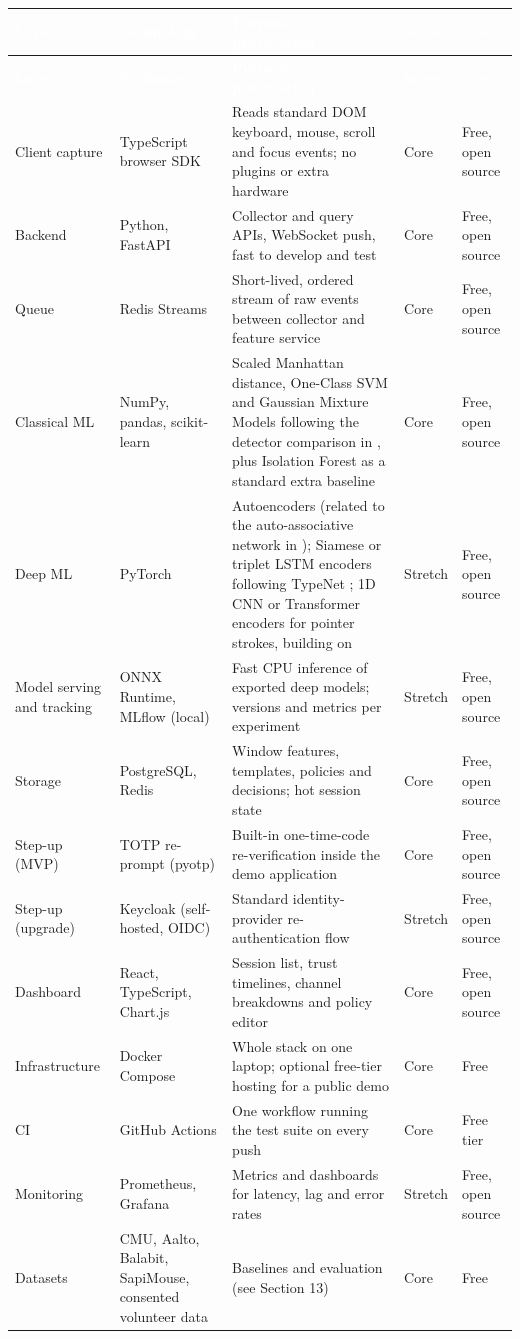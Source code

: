 \documentclass[10pt,letterpaper]{article}
\newcommand{\hd}[1]{\textcolor{white}{\bfseries #1}}
\newcommand{\headrow}{\rowcolor{navy}}
\begin{document}
\begin{xltabular}{\textwidth}{P{2.2cm} P{3.1cm} L P{1.2cm} P{1.5cm}}
\headrow \hd{Layer} & \hd{Technology} & \hd{Purpose / justification} & \hd{Scope} & \hd{Cost} \\
\endfirsthead
\headrow \hd{Layer} & \hd{Technology} & \hd{Purpose / justification} & \hd{Scope} & \hd{Cost} \\
\endhead
Client capture & TypeScript browser SDK & Reads standard DOM keyboard, mouse, scroll and focus events; no plugins or extra hardware & Core & Free, open source \\ \hline
Backend & Python, FastAPI & Collector and query APIs, WebSocket push, fast to develop and test & Core & Free, open source \\ \hline
Queue & Redis Streams & Short-lived, ordered stream of raw events between collector and feature service & Core & Free, open source \\ \hline
Classical ML & NumPy, pandas, scikit-learn & Scaled Manhattan distance, One-Class SVM and Gaussian Mixture Models following the detector comparison in \cite{killourhy2009}, plus Isolation Forest as a standard extra baseline & Core & Free, open source \\ \hline
Deep ML & PyTorch & Autoencoders (related to the auto-associative network in \cite{killourhy2009}); Siamese or triplet LSTM encoders following TypeNet \cite{acien2022}; 1D CNN or Transformer encoders for pointer strokes, building on \cite{antal2021} & Stretch & Free, open source \\ \hline
Model serving and tracking & ONNX Runtime, MLflow (local) & Fast CPU inference of exported deep models; versions and metrics per experiment & Stretch & Free, open source \\ \hline
Storage & PostgreSQL, Redis & Window features, templates, policies and decisions; hot session state & Core & Free, open source \\ \hline
Step-up (MVP) & TOTP re-prompt (pyotp) & Built-in one-time-code re-verification inside the demo application & Core & Free, open source \\ \hline
Step-up (upgrade) & Keycloak (self-hosted, OIDC) & Standard identity-provider re-authentication flow & Stretch & Free, open source \\ \hline
Dashboard & React, TypeScript, Chart.js & Session list, trust timelines, channel breakdowns and policy editor & Core & Free, open source \\ \hline
Infrastructure & Docker Compose & Whole stack on one laptop; optional free-tier hosting for a public demo & Core & Free \\ \hline
CI & GitHub Actions & One workflow running the test suite on every push & Core & Free tier \\ \hline
Monitoring & Prometheus, Grafana & Metrics and dashboards for latency, lag and error rates & Stretch & Free, open source \\ \hline
Datasets & CMU, Aalto, Balabit, SapiMouse, consented volunteer data & Baselines and evaluation (see Section 13) & Core & Free \\
\end{xltabular}
\end{document}
